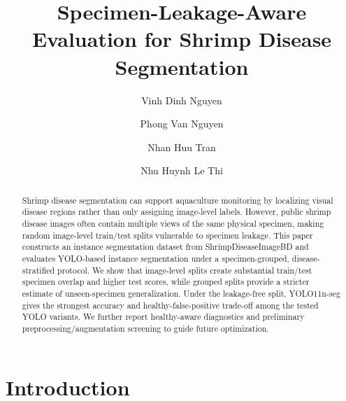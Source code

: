 \documentclass{svproc}
\begin{document}
\mainmatter

\title{Specimen-Leakage-Aware Evaluation for Shrimp Disease Segmentation}


\author{Vinh Dinh Nguyen \and Phong Van Nguyen \and Nhan Huu Tran \and Nhu Huynh Le Thi}





\maketitle

\begin{abstract}
Shrimp disease segmentation can support aquaculture monitoring by localizing visual disease regions rather than only assigning image-level labels. However, public shrimp disease images often contain multiple views of the same physical specimen, making random image-level train/test splits vulnerable to specimen leakage. This paper constructs an instance segmentation dataset from ShrimpDiseaseImageBD and evaluates YOLO-based instance segmentation under a specimen-grouped, disease-stratified protocol. We show that image-level splits create substantial train/test specimen overlap and higher test scores, while grouped splits provide a stricter estimate of unseen-specimen generalization. Under the leakage-free split, YOLO11n-seg gives the strongest accuracy and healthy-false-positive trade-off among the tested YOLO variants. We further report healthy-aware diagnostics and preliminary preprocessing/augmentation screening to guide future optimization.
\end{abstract}

\section{Introduction}
\end{document}

